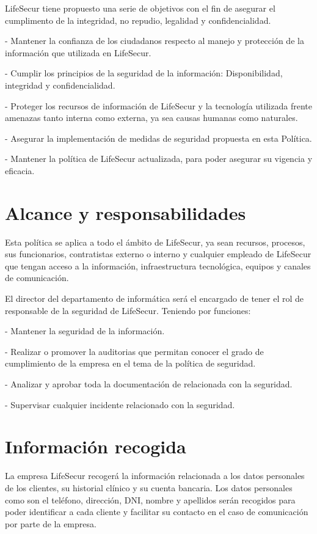 \documentclass[11pt,bibtotoc,noliststotoc,BCOR0mm]{scrbook}
\begin{document}
LifeSecur tiene propuesto una serie de objetivos con el fin de asegurar el cumplimento de la integridad, no repudio, legalidad y confidencialidad.

	- Mantener la confianza de los ciudadanos respecto al manejo y protección de la información que utilizada en LifeSecur.
    
	- Cumplir los principios de la seguridad de la información: Disponibilidad, integridad y confidencialidad.
    
	- Proteger los recursos de información de LifeSecur y la tecnología utilizada frente amenazas tanto interna como externa, ya sea causas humanas como naturales.
    
	- Asegurar la implementación de medidas de seguridad propuesta en esta Política.
    
	- Mantener la política de LifeSecur actualizada, para poder asegurar su vigencia y eficacia.


\section{Alcance y responsabilidades}

Esta política se aplica a todo el ámbito de LifeSecur, ya sean recursos, procesos, sus funcionarios, contratistas externo o interno y cualquier empleado de LifeSecur que tengan acceso a la información, infraestructura tecnológica, equipos y canales de comunicación.

El director del departamento de informática será el encargado de tener el rol de responsable de la seguridad de LifeSecur. Teniendo por funciones:

	- Mantener la seguridad de la información.
    
	- Realizar o promover la auditorias que permitan conocer el grado de cumplimiento de la empresa en el tema de la política de seguridad.
    
	- Analizar y aprobar toda la documentación de relacionada con la seguridad.
    
	- Supervisar cualquier incidente relacionado con la seguridad.


\section{Información recogida}

La empresa LifeSecur recogerá la información relacionada a los datos personales de los clientes, su historial clínico y su cuenta bancaria.
Los datos personales como son el teléfono, dirección, DNI, nombre y apellidos serán recogidos para poder identificar a cada cliente y facilitar su contacto en el caso de comunicación por parte de la empresa.
\end{document}
